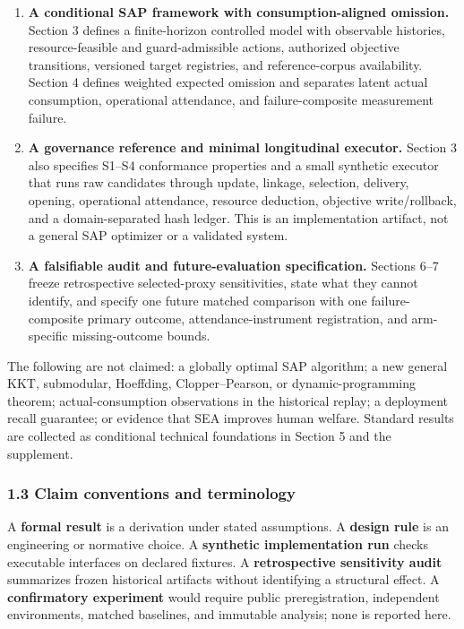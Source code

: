 \documentclass[
  11pt]{article}
\providecommand{\tightlist}{%
  \setlength{\itemsep}{0pt}\setlength{\parskip}{0pt}}
\begin{document}
\begin{enumerate}
\def\labelenumi{\arabic{enumi}.}
\tightlist
\item
  \textbf{A conditional SAP framework with consumption-aligned
  omission.} Section 3 defines a finite-horizon controlled model with
  observable histories, resource-feasible and guard-admissible actions,
  authorized objective transitions, versioned target registries, and
  reference-corpus availability. Section 4 defines weighted expected
  omission and separates latent actual consumption, operational
  attendance, and failure-composite measurement failure.
\item
  \textbf{A governance reference and minimal longitudinal executor.}
  Section 3 also specifies S1--S4 conformance properties and a small
  synthetic executor that runs raw candidates through update, linkage,
  selection, delivery, opening, operational attendance, resource
  deduction, objective write/rollback, and a domain-separated hash
  ledger. This is an implementation artifact, not a general SAP
  optimizer or a validated system.
\item
  \textbf{A falsifiable audit and future-evaluation specification.}
  Sections 6--7 freeze retrospective selected-proxy sensitivities, state
  what they cannot identify, and specify one future matched comparison
  with one failure-composite primary outcome, attendance-instrument
  registration, and arm-specific missing-outcome bounds.
\end{enumerate}

The following are not claimed: a globally optimal SAP algorithm; a new
general KKT, submodular, Hoeffding, Clopper--Pearson, or
dynamic-programming theorem; actual-consumption observations in the
historical replay; a deployment recall guarantee; or evidence that SEA
improves human welfare. Standard results are collected as conditional
technical foundations in Section 5 and the supplement.

\subsubsection{1.3 Claim conventions and
terminology}\label{claim-conventions-and-terminology}

A \textbf{formal result} is a derivation under stated assumptions. A
\textbf{design rule} is an engineering or normative choice. A
\textbf{synthetic implementation run} checks executable interfaces on
declared fixtures. A \textbf{retrospective sensitivity audit} summarizes
frozen historical artifacts without identifying a structural effect. A
\textbf{confirmatory experiment} would require public preregistration,
independent environments, matched baselines, and immutable analysis;
none is reported here.
\end{document}
